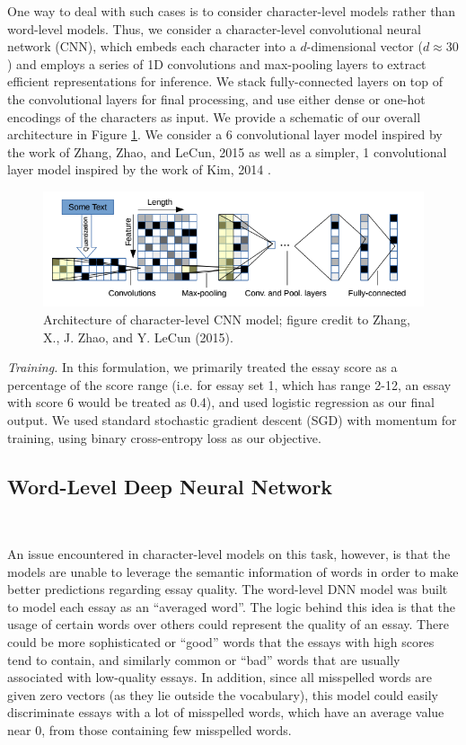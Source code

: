 \documentclass[10pt,psamsfonts]{amsart}
\theoremstyle{definition}
\theoremstyle{remark}
\numberwithin{equation}{section}
\begin{document}
One way to deal with such cases is to consider character-level models rather than word-level models. Thus, we consider a character-level convolutional neural network (CNN), which embeds each character into a $d$-dimensional vector ($d \approx 30$) and employs a series of 1D convolutions and max-pooling layers to extract efficient representations for inference. We stack fully-connected layers on top of the convolutional layers for final processing, and use either dense or one-hot encodings of the characters as input. We provide a schematic of our overall architecture in Figure \ref{fig:cnn}. We consider a 6 convolutional layer model inspired by the work of Zhang, Zhao, and LeCun, 2015 \cite{charnn} as well as a simpler, 1 convolutional layer model inspired by the work of Kim, 2014 \cite{kim14}.

\begin{figure}
	\includegraphics[width=\textwidth]{cnn.png}
	\caption{Architecture of character-level CNN model; figure credit to Zhang, X., J. Zhao, and Y. LeCun (2015).}
	\label{fig:cnn}
\end{figure}

{\em Training.} In this formulation, we primarily treated the essay score as a percentage of the score range (i.e. for essay set 1, which has range 2-12, an essay with score 6 would be treated as 0.4), and used logistic regression as our final output. We used standard stochastic gradient descent (SGD) with momentum for training, using binary cross-entropy loss as our objective.

\subsection*{Word-Level Deep Neural Network}\hfill\\
\vskip -0.1in

An issue encountered in character-level models on this task, however, is that the models are unable to leverage the semantic information of words in order to make better predictions regarding essay quality. The word-level DNN model was built to model each essay as an ``averaged word''. The logic behind this idea is that the usage of certain words over others could represent the quality of an essay. There could be more sophisticated or ``good'' words that the essays with high scores tend to contain, and similarly common or ``bad'' words that are usually associated with low-quality essays. In addition, since all misspelled words are given zero vectors (as they lie outside the vocabulary), this model could easily discriminate essays with a lot of misspelled words, which have an average value near 0, from those containing few misspelled words. 
\end{document}
